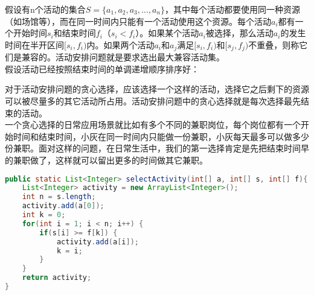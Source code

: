 假设有n个活动的集合$ S = \{a_1, a_2, a_3, \dots, a_n\} $，其中每个活动都要使用同一种资源（如场馆等），而在同一时间内只能有一个活动使用这个资源。每个活动$ a_i $都有一个开始时间$ s_i $和结束时间$ f_i $（$ s_i < f_i $）。如果某个活动$ a_i $被选择，那么活动$ a_i $的发生时间在半开区间$ [s_i, f_i) $内。如果两个活动$ a_i $和$ a_j $满足$ [s_i, f_i) $和$ [s_j, f_j) $不重叠，则称它们是兼容的。活动安排问题就是要求选出最大兼容活动集。\\

假设活动已经按照结束时间的单调递增顺序排序好：

\begin{table}[H]
	\centering
	\caption{活动安排}
\end{table}

对于活动安排问题的贪心选择，应该选择一个这样的活动，选择它之后剩下的资源可以被尽量多的其它活动所占用。活动安排问题中的贪心选择就是每次选择最先结束的活动。\\

一个贪心选择的日常应用场景就比如有多个不同的兼职岗位，每个岗位都有一个开始时间和结束时间，小灰在同一时间内只能做一份兼职，小灰每天最多可以做多少份兼职。面对这样的问题，在日常生活中，我们的第一选择肯定是先把结束时间早的兼职做了，这样就可以留出更多的时间做其它兼职。\\


\begin{lstlisting}[language=Java]
public static List<Integer> selectActivity(int[] a, int[] s, int[] f){
    List<Integer> activity = new ArrayList<Integer>();
    int n = s.length;
    activity.add(a[0]);
    int k = 0;
    for(int i = 1; i < n; i++) {
        if(s[i] >= f[k]) {
            activity.add(a[i]);
            k = i;
        }
    }
    return activity;
}
\end{lstlisting}

